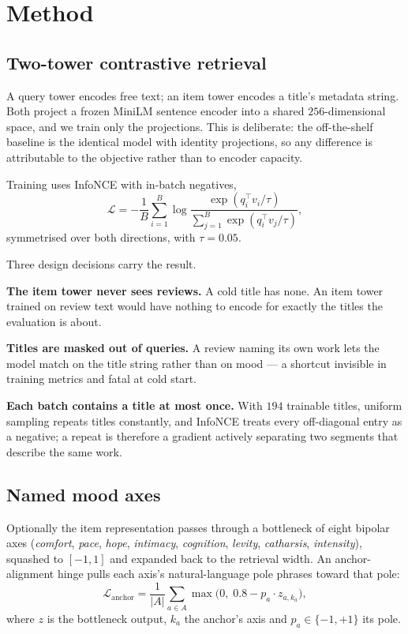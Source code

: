 \documentclass[11pt,a4paper]{article}
\begin{document}
\section{Method}

\subsection{Two-tower contrastive retrieval}

A query tower encodes free text; an item tower encodes a title's metadata
string. Both project a frozen MiniLM sentence encoder into a shared
$256$-dimensional space, and we train only the projections. This is deliberate:
the off-the-shelf baseline is the identical model with identity projections, so
any difference is attributable to the objective rather than to encoder capacity.

Training uses InfoNCE with in-batch negatives,
\[
\mathcal{L} = -\frac{1}{B}\sum_{i=1}^{B}
  \log \frac{\exp(q_i^\top v_i / \tau)}
            {\sum_{j=1}^{B}\exp(q_i^\top v_j / \tau)},
\]
symmetrised over both directions, with $\tau = 0.05$.

Three design decisions carry the result.

\textbf{The item tower never sees reviews.} A cold title has none. An item tower
trained on review text would have nothing to encode for exactly the titles the
evaluation is about.

\textbf{Titles are masked out of queries.} A review naming its own work lets the
model match on the title string rather than on mood --- a shortcut invisible in
training metrics and fatal at cold start.

\textbf{Each batch contains a title at most once.} With $194$ trainable titles,
uniform sampling repeats titles constantly, and InfoNCE treats every off-diagonal
entry as a negative; a repeat is therefore a gradient actively separating two
segments that describe the same work.

\subsection{Named mood axes}
\label{sec:axes}

Optionally the item representation passes through a bottleneck of eight bipolar
axes (\emph{comfort}, \emph{pace}, \emph{hope}, \emph{intimacy},
\emph{cognition}, \emph{levity}, \emph{catharsis}, \emph{intensity}), squashed
to $[-1,1]$ and expanded back to the retrieval width. An anchor-alignment hinge
pulls each axis's natural-language pole phrases toward that pole:
\[
\mathcal{L}_{\text{anchor}} =
  \frac{1}{|A|}\sum_{a \in A} \max\!\big(0,\; 0.8 - p_a \cdot z_{a, k_a}\big),
\]
where $z$ is the bottleneck output, $k_a$ the anchor's axis and
$p_a \in \{-1,+1\}$ its pole.
\end{document}
